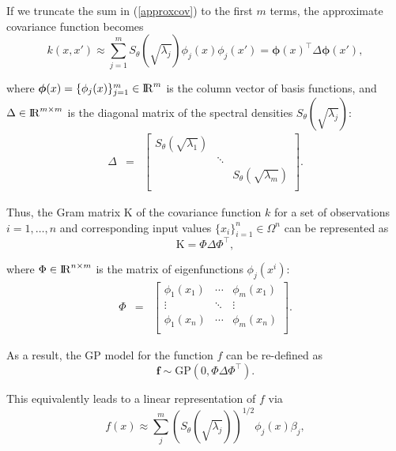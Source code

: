 \documentclass[]{interact}
\theoremstyle{plain}%
\theoremstyle{definition}
\theoremstyle{remark}
\begin{document}
If we truncate the sum in (\ref{approxcov}) to the first $m$ terms, the approximate covariance function becomes
%
\begin{equation}
k(x,x') \approx \sum_{j=1}^m S_{\theta}(\sqrt{\lambda_j}) \phi_j(x) \phi_j(x') = \boldsymbol{\phi}(x)^\intercal \Delta \boldsymbol{\phi}(x'), \nonumber
\end{equation}

\noindent where $\boldsymbol{\phi}(x)=\{\phi_j(x)\}_{j=1}^{m} \in {\rm I\!R}^{m}$ is the column vector of basis functions, and $\Delta  \in {\rm I\!R}^{m\times m}$ is the diagonal matrix of the spectral densities $S_{\theta}(\sqrt{\lambda_j})$: 
%
\begin{eqnarray}
\Delta &=&  \begin{bmatrix}
    S_{\theta}(\sqrt{\lambda_1}) & & \\
    & \ddots & \nonumber \\
    & & S_{\theta}(\sqrt{\lambda_m}) \\
  \end{bmatrix}.
\end{eqnarray}

Thus, the Gram matrix $\text{K}$ of the covariance function $k$ for a set of observations $i=1,\ldots,n$ and corresponding input values $\{x_i\}_{i=1}^{n} \in \Omega^{n}$ can be represented as
%
\begin{equation}
\text{K}= \Phi \Delta \Phi^\intercal, \nonumber
\end{equation}

\noindent where $\Phi \in {\rm I\!R}^{n\times m}$ is the matrix of eigenfunctions $\phi_j(x^i)$:
%
\begin{eqnarray}
\Phi &=&  \left[ {\begin{array}{ccc}
   \phi_1(x_1) & \cdots & \phi_m(x_1)  \\
    \vdots &\ddots & \vdots  \nonumber \\ 
    \phi_1(x_n) & \cdots & \phi_m(x_n) \\
  \end{array} } \right].
\end{eqnarray}
 
\noindent As a result, the GP model for the function $f$ can be re-defined as
%
\begin{equation}
\mathbf{f} \sim \text{GP}(0,\Phi \Delta \Phi^\intercal). \nonumber
\end{equation}

\noindent This equivalently leads to a linear representation of $f$ via
%
\begin{equation}\label{approxf}
f(x) \approx \sum_{j}^m \left( S_{\theta}(\sqrt{\lambda_j})\right)^{1/2} \phi_j(x) \beta_j, \nonumber
\end{equation}
\end{document}
